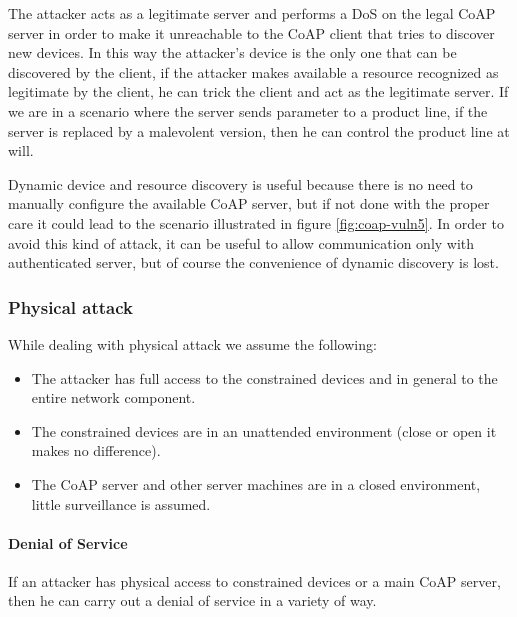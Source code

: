	The attacker acts as a legitimate server and performs a DoS on the legal CoAP server in order to make it unreachable to the CoAP client that tries to discover new devices.\newline
	In this way the attacker's device is the only one that can be discovered by the client, if the attacker makes available a resource recognized as legitimate by the client, he can trick the client and act as the legitimate server.\newline
	If we are in a scenario where the server sends parameter to a product line, if the server is replaced by a malevolent version, then he can control the product line at will.\newline
	
	Dynamic device and resource discovery is useful because there is no need to manually configure the available CoAP server, but if not done with the proper care it could lead to the scenario illustrated in figure \ref{fig:coap-vuln5}.
	In order to avoid this kind of attack, it can be useful to allow communication only with authenticated server, but of course the convenience of dynamic discovery is lost.\newline
		

	\subsubsection{Physical attack}
	While dealing with physical attack we assume the following:
	\begin{itemize}
		\item The attacker has full access to the constrained devices and in general to the entire network component.
		\item The constrained devices are in an unattended environment (close or open it makes no difference).
		\item The CoAP server and other server machines are in a closed environment, little surveillance is assumed.
	\end{itemize}
	
	\paragraph{Denial of Service}
	If an attacker has physical access to constrained devices or a main CoAP server, then he can carry out a denial of service in a variety of way.\newline
	
